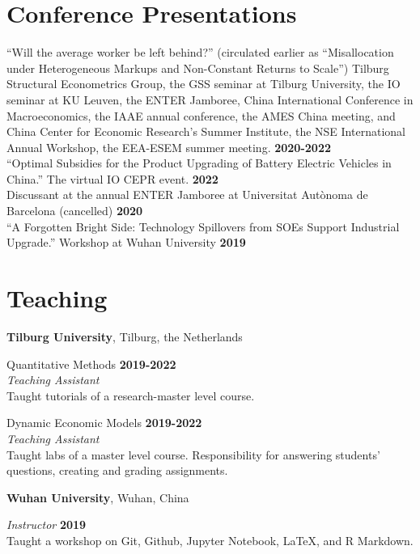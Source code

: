 \documentclass[margin,line]{res}
\begin{document}
\begin{resume}
\section{\sc Conference Presentations}
``Will the average worker be left behind?'' (circulated earlier as ``Misallocation under Heterogeneous Markups and Non-Constant Returns to Scale'')
Tilburg Structural Econometrics Group, the GSS seminar at Tilburg University, the IO seminar at KU Leuven, the ENTER Jamboree, China International Conference in Macroeconomics, the IAAE annual conference, the AMES China meeting, and China Center for Economic Research’s Summer Institute, the NSE International Annual Workshop, the EEA-ESEM summer meeting.  \hfill {\bf 2020-2022}
\vspace{-.3cm}\\

``Optimal Subsidies for the Product Upgrading of Battery Electric Vehicles in China.'' The virtual IO CEPR event.  \hfill {\bf 2022}
\vspace{-.3cm}\\

Discussant at the annual ENTER Jamboree at Universitat Aut\`onoma de Barcelona (cancelled) \hfill {\bf 2020}
\vspace{-.3cm}\\


``A Forgotten Bright Side: Technology Spillovers from SOEs Support
Industrial Upgrade.'' Workshop at Wuhan University \hfill {\bf 2019}

\section{\sc Teaching}
{\bf Tilburg University}, Tilburg, the Netherlands

\vspace{-.3cm}
Quantitative Methods \hfill {\bf 2019-2022}\\
{\em Teaching Assistant}\\
Taught tutorials of a research-master level course. 

\vspace{-.3cm}
Dynamic Economic Models \hfill {\bf 2019-2022}\\
{\em Teaching Assistant}\\
Taught labs of a master level course. Responsibility for answering students' questions, creating and grading assignments.  


{\bf Wuhan University}, Wuhan, China

\vspace{-.3cm}
{\em Instructor} \hfill {\bf 2019}\\
Taught a workshop on Git, Github, Jupyter Notebook, \LaTeX, and R Markdown.


\end{resume}
\end{document}
